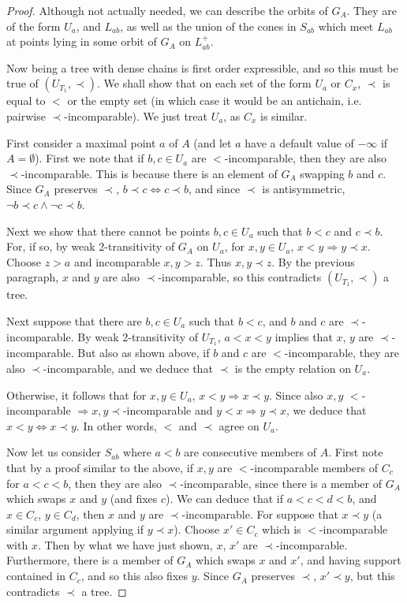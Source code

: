 \documentclass[a4paper,reqno]{amsart}
\numberwithin{equation}{section}
\begin{document}
\begin{proof}
Although not actually needed, we can describe the orbits of $G_A$. They are of the form $U_a$, and $L_{ab}$, as well 
as the union of the cones in $S_{ab}$ which meet $L_{ab}$ at points lying in some orbit of $G_A$ on $L_{ab}^+$.

Now being a tree with dense chains is first order expressible, and so this must be true of $(U_{T_1}, \prec)$. We shall show
that on each set of the form $U_a$ or $C_x$, $\prec$ is equal to $<$ or the empty set (in which case it would be an antichain, 
i.e. pairwise $\prec$-incomparable). We just treat $U_a$, as $C_x$ is similar.

First consider a maximal point $a$ of $A$ (and let $a$ have a default value of $-\infty$ if $A = \emptyset$). First we note
that if $b, c \in U_a$ are $<$-incomparable, then they are also $\prec$-incomparable. This is because there is an 
element of $G_A$ swapping $b$ and $c$. Since $G_A$ preserves $\prec$, $b \prec c \Leftrightarrow c \prec b$, and since
$\prec$ is antisymmetric, $\neg b \prec c \wedge \neg c \prec b$. 

Next we show that there cannot be points $b, c \in U_a$ such that $b < c$ and $c \prec b$. For, if so, by weak
2-transitivity of $G_A$ on $U_a$, for $x, y \in U_a$, $x < y \Rightarrow y \prec x$. Choose $z > a$ and incomparable 
$x, y > z$. Thus $x, y \prec z$. By the previous paragraph, $x$ and $y$ are also $\prec$-incomparable, so this 
contradicts $(U_{T_1}, \prec)$ a tree. 

Next suppose that there are $b, c \in U_a$ such that $b < c$, and $b$ and $c$ are $\prec$-incomparable. By 
weak 2-transitivity of $U_{T_1}$, $a < x < y$ implies that $x$, $y$ are $\prec$-incomparable. But also as shown above, if
$b$ and $c$ are $<$-incomparable, they are also $\prec$-incomparable, and we deduce that $\prec$ is the empty relation
on $U_a$.

Otherwise, it follows that for $x, y \in U_a$, $x < y \Rightarrow x \prec y$. Since also $x, y$ $<$-incomparable
$\Rightarrow x, y \prec$-incomparable and $y < x \Rightarrow y \prec x$, we deduce that $x < y \Leftrightarrow x \prec y$. 
In other words, $<$ and $\prec$ agree on $U_a$.

Now let us consider $S_{ab}$ where $a < b$ are consecutive members of $A$. First note that by a proof similar to the above,
if $x, y$ are $<$-incomparable members of $C_c$ for $a < c < b$, then they are also $\prec$-incomparable, since there is a 
member of $G_A$ which swaps $x$ and $y$ (and fixes $c$). We can deduce that if $a < c < d < b$, and $x \in C_c$, $y \in C_d$,
then $x$ and $y$ are $\prec$-incomparable. For suppose that $x \prec y$ (a similar argument applying if $y \prec x$). Choose
$x' \in C_c$ which is $<$-incomparable with $x$. Then by what we have just shown, $x$, $x'$ are $\prec$-incomparable. 
Furthermore, there is a member of $G_A$ which swaps $x$ and $x'$, and having support contained in $C_c$, and so this also
fixes $y$. Since $G_A$ preserves $\prec$, $x' \prec y$, but this contradicts $\prec$ a tree.


\end{proof}
\end{document}
